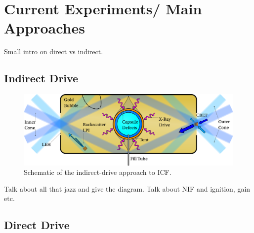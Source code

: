 \section{Current Experiments/ Main Approaches}%
\label{sec:intro_mainexperiments}

Small intro on direct vs indirect.

\subsection{Indirect Drive}%
\label{sec:intro_indirect}

\begin{figure}[t!]
    \includegraphics[width=\linewidth]{Introduction/Images/indirect icf white.png}
    \centering
    \caption{Schematic of the indirect-drive approach to \ac{ICF}.
    }%
    \label{fig:intro_indirect}
\end{figure}

Talk about all that jazz and give the diagram.
Talk about NIF and ignition, gain etc.

\subsection{Direct Drive}%
\label{sec:intro_direct}

